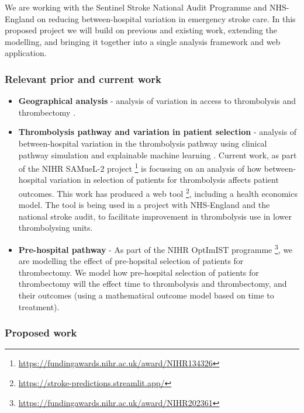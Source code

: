 We are working with the Sentinel Stroke National Audit Programme and NHS-England on reducing between-hospital variation in emergency stroke care. In this proposed project we will build on previous and existing work, extending the modelling, and bringing it together into a single analysis framework and web application. 

\subsubsection{Relevant prior and current work}

\begin{itemize}
    \item \textbf{Geographical analysis} - analysis of variation in access to thrombolysis and thrombectomy \cite{allen_maximising_2019}.

    \item \textbf{Thrombolysis pathway and variation in patient selection} - analysis of between-hospital variation in the thrombolysis pathway using clinical pathway simulation and explainable machine learning \cite{allen_use_2022, pearn_what_2023}. Current work, as part of the NIHR SAMueL-2 project \footnote{\url{https://fundingawards.nihr.ac.uk/award/NIHR134326}} is focussing on an analysis of how between-hospital variation in selection of patients for thrombolysis affects patient outcomes. This work has produced a web tool \footnote{\url{https://stroke-predictions.streamlit.app/}}, including a health economics model. The tool is being used in a project with NHS-England and the national stroke audit, to facilitate improvement in thrombolysis use in lower thrombolysing units. 

    \item \textbf{Pre-hospital pathway} - As part of the NIHR OptImIST programme \footnote{\url{https://fundingawards.nihr.ac.uk/award/NIHR202361}}, we are modelling the effect of pre-hopsital selection of patients for thrombectomy. We model how pre-hospital selection of patients for thrombectomy will the effect time to thrombolysis and thrombectomy, and their outcomes (using a mathematical outcome model based on time to treatment).
    
\end{itemize}

\subsubsection{Proposed work}


